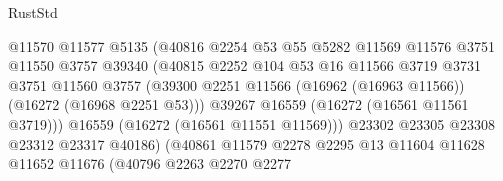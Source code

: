 \begin{lexlean}{RustStd}
\begin{coremodule}
                                      @11570
                                      @11577
                                      @5135
                                      (@40816
                                        @2254
                                        @53
                                        @55
                                        @5282
                                        @11569
                                        @11576
                                        @3751
                                        @11550
                                        @3757
                                        @39340
                                        (@40815
                                          @2252
                                          @104
                                          @53
                                          @16
                                          @11566
                                          @3719
                                          @3731
                                          @3751
                                          @11560
                                          @3757
                                          (@39300
                                            @2251
                                            @11566
                                            (@16962 (@16963 @11566))
                                            (@16272 (@16968 @2251 @53)))
                                          @39267
                                          @16559
                                          (@16272 (@16561 @11561 @3719)))
                                        @16559
                                        (@16272 (@16561 @11551 @11569)))
                                      @23302
                                      @23305
                                      @23308
                                      @23312
                                      @23317
                                      @40186)
                                    (@40861
                                      @11579
                                      @2278
                                      @2295
                                      @13
                                      @11604
                                      @11628
                                      @11652
                                      @11676
                                      (@40796
                                        @2263
                                        @2270
                                        @2277

\end{coremodule}
\end{lexlean}
